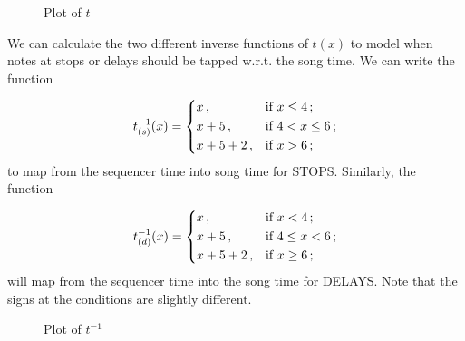 \documentclass[a4paper,9pt]{article}
\begin{document}
\begin{figure}[htpb]
	\centering

\caption{Plot of $t$ }
	\label{fig:songtime2seqtime}
\end{figure}

    We can calculate the two different inverse functions of $ t(x) $ to model when notes at stops or delays should be tapped w.r.t. the song time. We can write the function

    \begin{equation}
	    t^{-1}_{(s)}(x) =\begin{dcases}
		    x\,, &\text{if $ x \leq 4 $}\,;\\
		    x+5\,,& \text{if $ 4 < x \leq 6 $}\,;\\
		    x+5+2\,,& \text{if $ x > 6 $}\,;\\
	    \end{dcases}
	    \label{eq:tostops}
    \end{equation}
    to map from the sequencer time into song time for STOPS. Similarly, the function

    \begin{equation}
	    t^{-1}_{(d)}(x) =\begin{dcases}
		    x\,, &\text{if $ x < 4 $}\,;\\
		    x+5\,,& \text{if $ 4 \leq x < 6 $}\,;\\
		    x+5+2\,,& \text{if $ x \geq 6 $}\,;\\
	    \end{dcases}
	    \label{eq:todelays}
    \end{equation}
    will map from the sequencer time into the song time for DELAYS. Note that the signs at the conditions are slightly different.


\begin{figure}[htpb]
	\centering


\caption{Plot of $t^{-1}$ }
	\label{fig:seqtime2songtime}
\end{figure}
\end{document}
